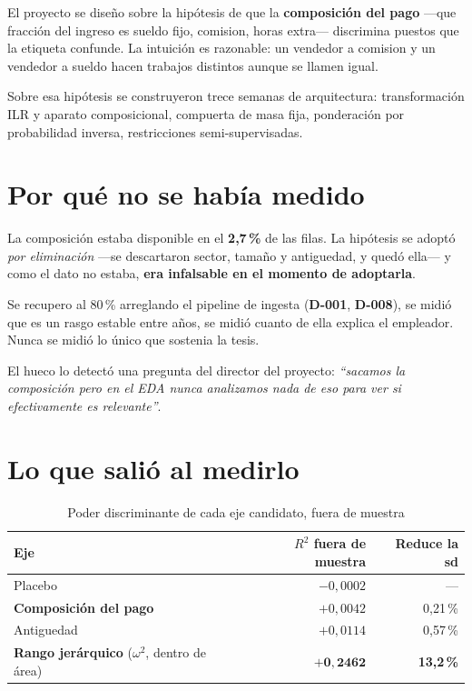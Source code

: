 \documentclass[12pt,a4paper]{report}
\newcommand{\dref}[1]{\textbf{D-#1}}
\begin{document}
El proyecto se diseño sobre la hipótesis de que la \textbf{composición del pago}
---que fracción del ingreso es sueldo fijo, comision, horas extra--- discrimina
puestos que la etiqueta confunde. La intuición es razonable: un vendedor a
comision y un vendedor a sueldo hacen trabajos distintos aunque se llamen igual.

Sobre esa hipótesis se construyeron trece semanas de arquitectura: transformación
ILR y aparato composicional, compuerta de masa fija, ponderación por
probabilidad inversa, restricciones semi-supervisadas.

\section{Por qué no se había medido}

La composición estaba disponible en el \textbf{2,7\,\%} de las filas. La hipótesis
se adoptó \emph{por eliminación} ---se descartaron sector, tamaño y antiguedad, y
quedó ella--- y como el dato no estaba, \textbf{era infalsable en el momento de
adoptarla}.

Se recupero al 80\,\% arreglando el pipeline de ingesta (\dref{001}, \dref{008}),
se midió que es un rasgo estable entre años, se midió cuanto de ella explica el
empleador. Nunca se midió lo único que sostenia la tesis.

El hueco lo detectó una pregunta del director del proyecto: \emph{``sacamos la
composición pero en el EDA nunca analizamos nada de eso para ver si efectivamente
es relevante''}.

\section{Lo que salió al medirlo}

\begin{table}[h]
\centering
\caption{Poder discriminante de cada eje candidato, fuera de muestra}
\label{tab:ejes}
\begin{tabular}{lrr}
\toprule
Eje & $R^2$ fuera de muestra & Reduce la sd \\
\midrule
Placebo & $-0{,}0002$ & --- \\
\textbf{Composición del pago} & $+0{,}0042$ & 0,21\,\% \\
Antiguedad & $+0{,}0114$ & 0,57\,\% \\
\textbf{Rango jerárquico} ($\omega^2$, dentro de área) & $\mathbf{+0{,}2462}$ & \textbf{13,2\,\%} \\
\bottomrule
\end{tabular}
\end{table}
\end{document}
